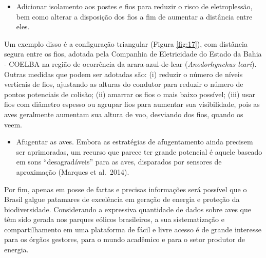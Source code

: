 \documentclass[
  oneside]{scrbook}
\providecommand{\tightlist}{%
  \setlength{\itemsep}{0pt}\setlength{\parskip}{0pt}}
\begin{document}
\begin{itemize}
\tightlist
\item
  Adicionar isolamento aos postes e fios para reduzir o risco de eletroplessão, bem como alterar a disposição dos fios a fim de aumentar a distância entre eles.
\end{itemize}

Um exemplo disso é a configuração triangular (Figura \ref{fig:17}), com distância segura entre os fios, adotada pela Companhia de Eletricidade do Estado da Bahia - COELBA na região de ocorrência da arara-azul-de-lear (\emph{Anodorhynchus leari}). Outras medidas que podem ser adotadas são: (i) reduzir o número de níveis verticais de fios, ajustando as alturas do condutor para reduzir o número de pontos potenciais de colisão; (ii) amarrar os fios o mais baixo possível; (iii) usar fios com diâmetro espesso ou agrupar fios para aumentar sua visibilidade, pois as aves geralmente aumentam sua altura de voo, desviando dos fios, quando os veem.

\begin{itemize}
\tightlist
\item
  Afugentar as aves. Embora as estratégias de afugentamento ainda precisem ser aprimoradas, um recurso que parece ter grande potencial é aquele baseado em sons ``desagradáveis'' para as aves, disparados por sensores de aproximação (Marques et al.~2014).
\end{itemize}

Por fim, apenas em posse de fartas e precisas informações será possível que o Brasil galgue patamares de excelência em geração de energia e proteção da biodiversidade. Considerando a expressiva quantidade de dados sobre aves que têm sido gerada nos parques eólicos brasileiros, a sua sistematização e compartilhamento em uma plataforma de fácil e livre acesso é de grande interesse para os órgãos gestores, para o mundo acadêmico e para o setor produtor de energia.
\end{document}
